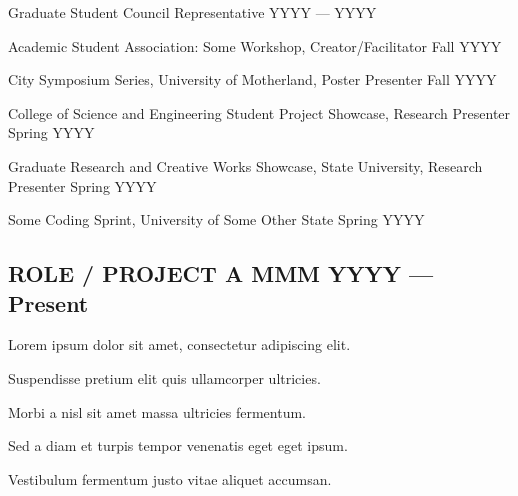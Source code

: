 Graduate Student Council Representative	\hfill YYYY --- YYYY
 
Academic Student Association: Some Workshop, Creator/Facilitator	\hfill Fall YYYY

City Symposium Series, University of Motherland, Poster Presenter	\hfill Fall YYYY

College of Science and Engineering Student Project Showcase, Research Presenter	\hfill Spring YYYY

Graduate Research and Creative Works Showcase, State University, Research Presenter	\hfill Spring YYYY

Some Coding Sprint, University of Some Other State	\hfill Spring YYYY
\subsection{{ROLE / PROJECT A \hfill MMM YYYY --- Present}}
\begin{zitemize}
\item Lorem ipsum dolor sit amet, consectetur adipiscing elit.
\item Suspendisse pretium elit quis ullamcorper ultricies.
\item Morbi a nisl sit amet massa ultricies fermentum.
\item Sed a diam et turpis tempor venenatis eget eget ipsum.
\item Vestibulum fermentum justo vitae aliquet accumsan.
\end{zitemize}

